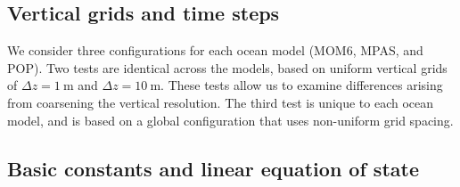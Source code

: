 \subsection{Vertical grids and time steps}

We consider three configurations for each ocean model (MOM6, MPAS, and
POP).  Two tests are identical across the models, based on uniform
vertical grids of $\Delta z = 1~\mbox{m}$ and $\Delta z =
10~\mbox{m}$.  These tests allow us to examine differences arising
from coarsening the vertical resolution.  The third test is unique to
each ocean model, and is based on a global configuration that uses
non-uniform grid spacing.

\begin{table}[h!t]
\caption{Model vertical grid spacing, bottom depth,  and time steps for the CVMix column tests.}
\label{table:kpp-model-configuration}
\end{table}


\subsection{Basic constants and linear equation of state}

